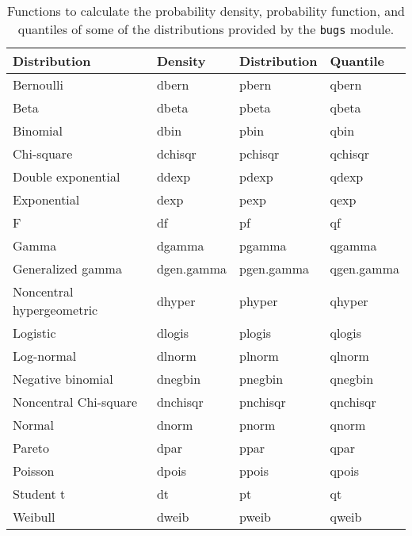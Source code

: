 \documentclass[11pt, a4paper, titlepage]{report}
\begin{document}
\begin{table}
\begin{center}
\begin{tabular}{llll}
\hline
Distribution & Density & Distribution & Quantile \\
\hline
Bernoulli          & dbern     & pbern     & qbern \\
Beta               & dbeta     & pbeta     & qbeta \\
Binomial           & dbin      & pbin      & qbin \\
Chi-square         & dchisqr   & pchisqr   & qchisqr \\
Double exponential & ddexp     & pdexp     & qdexp \\
Exponential        & dexp      & pexp      & qexp \\
F                  & df        & pf        & qf \\
Gamma              & dgamma    & pgamma    & qgamma \\
Generalized gamma  & dgen.gamma & pgen.gamma & qgen.gamma \\
Noncentral hypergeometric     & dhyper    & phyper    & qhyper \\
Logistic           & dlogis    & plogis    & qlogis \\
Log-normal         & dlnorm    & plnorm    & qlnorm \\
Negative binomial  & dnegbin   & pnegbin   & qnegbin \\
Noncentral Chi-square & dnchisqr   & pnchisqr   & qnchisqr \\
Normal             & dnorm     & pnorm     & qnorm \\
Pareto             & dpar      & ppar      & qpar \\
Poisson            & dpois     & ppois     & qpois \\
Student t          & dt        & pt        & qt \\
Weibull            & dweib     & pweib     & qweib \\
\hline
\end{tabular}
\caption{Functions to calculate the probability density, probability
  function, and quantiles of some of the distributions provided by the
  \texttt{bugs} module. \label{table:bugs:dpq}}
\end{center}
\end{table}
\end{document}

